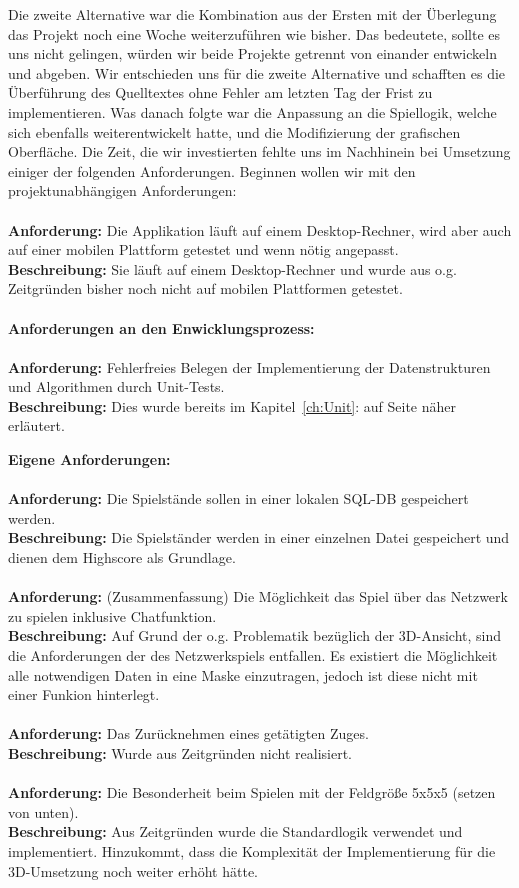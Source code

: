 \documentclass[a4paper]{scrartcl}
\begin{document}
Die zweite Alternative war die Kombination aus der Ersten mit der Überlegung das Projekt noch eine Woche weiterzuführen wie bisher. Das bedeutete, sollte es uns nicht gelingen, würden wir beide Projekte getrennt von einander entwickeln und abgeben. Wir entschieden uns für die zweite Alternative und schafften es die Überführung des Quelltextes ohne Fehler am letzten Tag der Frist zu implementieren. Was danach folgte war die Anpassung an die Spiellogik, welche sich ebenfalls weiterentwickelt hatte, und die Modifizierung der grafischen Oberfläche. Die Zeit, die wir investierten fehlte uns im Nachhinein bei Umsetzung einiger der folgenden Anforderungen. Beginnen wollen wir mit den projektunabhängigen Anforderungen:
\\
\\
\textbf{Anforderung:} Die Applikation läuft auf einem Desktop-Rechner, wird aber auch auf einer mobilen Plattform getestet und wenn nötig angepasst.
\\
\textbf{Beschreibung:}  Sie läuft auf einem Desktop-Rechner und wurde aus o.g. Zeitgründen bisher noch nicht auf mobilen Plattformen getestet. 
\\
\\
\textbf{Anforderungen an den Enwicklungsprozess:}
\\
\\
\textbf{Anforderung:} Fehlerfreies Belegen der Implementierung der Datenstrukturen und Algorithmen durch Unit-Tests. 
\\
\textbf{Beschreibung:} Dies wurde bereits im Kapitel~\ref{ch:Unit}: auf Seite \pageref{ch:Unit} näher erläutert.


\textbf{Eigene Anforderungen:}
\\
\\
\textbf{Anforderung:} Die Spielstände sollen in einer lokalen SQL-DB gespeichert werden.
\\
\textbf{Beschreibung:} Die Spielständer werden in einer einzelnen Datei gespeichert und dienen dem Highscore als Grundlage.
\\
\\
\textbf{Anforderung:} (Zusammenfassung) Die Möglichkeit das Spiel über das Netzwerk zu spielen inklusive Chatfunktion.
\\
\textbf{Beschreibung:} Auf Grund der o.g. Problematik bezüglich der 3D-Ansicht, sind die Anforderungen der des Netzwerkspiels entfallen. Es existiert die Möglichkeit alle notwendigen Daten in eine Maske einzutragen, jedoch ist diese nicht mit einer Funkion hinterlegt.
\\
\\
\textbf{Anforderung:} Das Zurücknehmen eines getätigten Zuges. 
\\
\textbf{Beschreibung:} Wurde aus Zeitgründen nicht realisiert.
\\
\\
\textbf{Anforderung:} Die Besonderheit beim Spielen mit der Feldgröße 5x5x5 (setzen von unten).
\\
\textbf{Beschreibung:} Aus Zeitgründen wurde die Standardlogik verwendet und implementiert. Hinzukommt, dass die Komplexität der Implementierung für die 3D-Umsetzung noch weiter erhöht hätte.
\end{document}
